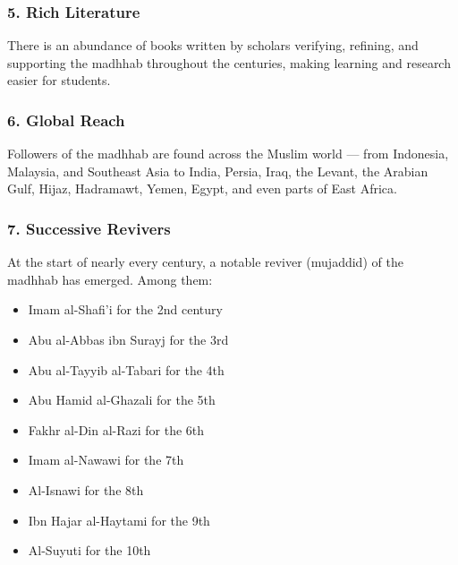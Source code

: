 \documentclass[
  a4paper,
  DIV=11,
  numbers=noendperiod]{scrartcl}
\providecommand{\tightlist}{%
  \setlength{\itemsep}{0pt}\setlength{\parskip}{0pt}}
\begin{document}
\subsubsection{5. Rich Literature}\label{rich-literature}

There is an abundance of books written by scholars verifying, refining,
and supporting the madhhab throughout the centuries, making learning and
research easier for students.

\subsubsection{6. Global Reach}\label{global-reach}

Followers of the madhhab are found across the Muslim world --- from
Indonesia, Malaysia, and Southeast Asia to India, Persia, Iraq, the
Levant, the Arabian Gulf, Hijaz, Hadramawt, Yemen, Egypt, and even parts
of East Africa.

\subsubsection{7. Successive Revivers}\label{successive-revivers}

At the start of nearly every century, a notable reviver (mujaddid) of
the madhhab has emerged. Among them:

\begin{itemize}
\tightlist
\item
  Imam al-Shafi'i for the 2nd century\\
\item
  Abu al-Abbas ibn Surayj for the 3rd\\
\item
  Abu al-Tayyib al-Tabari for the 4th\\
\item
  Abu Hamid al-Ghazali for the 5th\\
\item
  Fakhr al-Din al-Razi for the 6th\\
\item
  Imam al-Nawawi for the 7th\\
\item
  Al-Isnawi for the 8th\\
\item
  Ibn Hajar al-Haytami for the 9th\\
\item
  Al-Suyuti for the 10th
\end{itemize}
\end{document}
